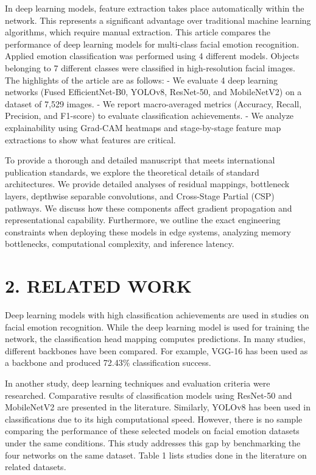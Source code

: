 \documentclass[journal,10pt]{IEEEtran}
\begin{document}
In deep learning models, feature extraction takes place automatically within the network. This represents a significant advantage over traditional machine learning algorithms, which require manual extraction. This article compares the performance of deep learning models for multi-class facial emotion recognition. Applied emotion classification was performed using 4 different models. Objects belonging to 7 different classes were classified in high-resolution facial images. The highlights of the article are as follows:
- We evaluate 4 deep learning networks (Fused EfficientNet-B0, YOLOv8, ResNet-50, and MobileNetV2) on a dataset of 7,529 images.
- We report macro-averaged metrics (Accuracy, Recall, Precision, and F1-score) to evaluate classification achievements.
- We analyze explainability using Grad-CAM heatmaps and stage-by-stage feature map extractions to show what features are critical.

To provide a thorough and detailed manuscript that meets international publication standards, we explore the theoretical details of standard architectures. We provide detailed analyses of residual mappings, bottleneck layers, depthwise separable convolutions, and Cross-Stage Partial (CSP) pathways. We discuss how these components affect gradient propagation and representational capability. Furthermore, we outline the exact engineering constraints when deploying these models in edge systems, analyzing memory bottlenecks, computational complexity, and inference latency.

\section{2. RELATED WORK}
Deep learning models with high classification achievements are used in studies on facial emotion recognition. While the deep learning model is used for training the network, the classification head mapping computes predictions. In many studies, different backbones have been compared. For example, VGG-16 has been used as a backbone and produced 72.43\% classification success. 

In another study, deep learning techniques and evaluation criteria were researched. Comparative results of classification models using ResNet-50 and MobileNetV2 are presented in the literature. Similarly, YOLOv8 has been used in classifications due to its high computational speed. However, there is no sample comparing the performance of these selected models on facial emotion datasets under the same conditions. This study addresses this gap by benchmarking the four networks on the same dataset. Table 1 lists studies done in the literature on related datasets.
\end{document}
